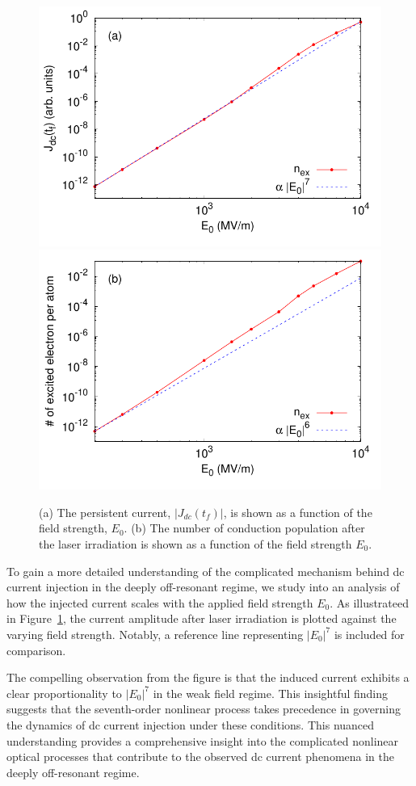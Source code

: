 \begin{figure}[htbp]
\centering
\includegraphics[width=0.80\linewidth]{pic/dc_current_vs_E0.pdf}
\includegraphics[width=0.80\linewidth]{pic/nex_vs_E0.pdf}
\caption{\label{fig:dc_current_vs_E0} 
(a) The persistent current, $|J_{dc}(t_f)|$, is shown as a function of the field strength, $E_0$. (b) The number of conduction population after the laser irradiation is shown as a function of the field strength $E_0$.
}
\end{figure}
To gain a more detailed understanding of the complicated mechanism behind dc current injection in the deeply off-resonant regime, we study into an analysis of how the injected current scales with the applied field strength $E_0$. As illustrateed in Figure~\ref{fig:dc_current_vs_E0}, the current amplitude after laser irradiation is plotted against the varying field strength. Notably, a reference line representing $|E_0|^7$ is included for comparison.

The compelling observation from the figure is that the induced current exhibits a clear proportionality to $|E_0|^7$ in the weak field regime. This insightful finding suggests that the seventh-order nonlinear process takes precedence in governing the dynamics of dc current injection under these conditions. This nuanced understanding provides a comprehensive insight into the complicated nonlinear optical processes that contribute to the observed dc current phenomena in the deeply off-resonant regime.

